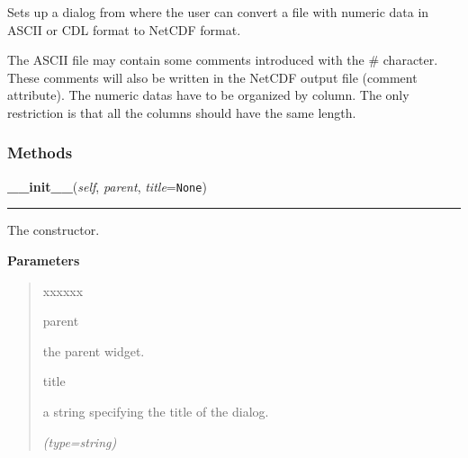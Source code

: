 Sets up a dialog from where the user can convert a file with numeric data 
in ASCII or CDL format to NetCDF format.

The ASCII file may contain some comments introduced with the \# character. 
These comments will also be written in the NetCDF output file 
({\textbar}comment{\textbar} attribute). The numeric datas have to be 
organized by column. The only restriction is that all the columns should 
have the same length.



  \subsubsection{Methods}

    \label{nMOLDYN:GUI:ASCIIToNetCDFConversionDialog:ASCIIToNetCDFConversionDialog:__init__}

    \vspace{0.5ex}

\hspace{.8\funcindent}\begin{boxedminipage}{\funcwidth}

    \raggedright \textbf{\_\_init\_\_}(\textit{self}, \textit{parent}, \textit{title}={\tt None})

    \vspace{-1.5ex}

    \rule{\textwidth}{0.5\fboxrule}
\setlength{\parskip}{2ex}
    The constructor.

\setlength{\parskip}{1ex}
      \textbf{Parameters}
      \vspace{-1ex}

      \begin{quote}
        \begin{Ventry}{xxxxxx}

          \item[parent]

          the parent widget.

          \item[title]

          a string specifying the title of the dialog.

            {\it (type=string)}

        \end{Ventry}

      \end{quote}

    \end{boxedminipage}

